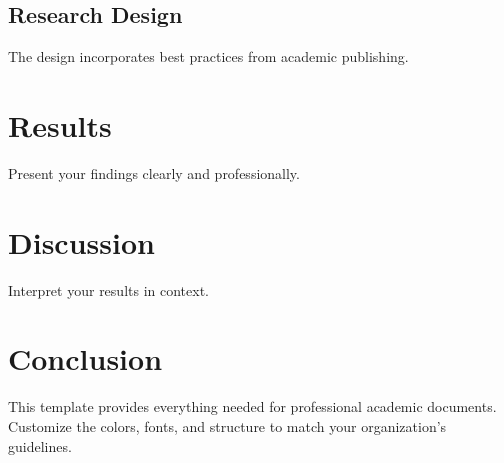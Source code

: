 \documentclass[11pt]{article}
\begin{document}
\subsection{Research Design}

The design incorporates best practices from academic publishing.

\section{Results}

Present your findings clearly and professionally.

\section{Discussion}

Interpret your results in context.

\section{Conclusion}

This template provides everything needed for professional academic documents. Customize the colors, fonts, and structure to match your organization's guidelines.

\nocite{*}
\printbibliography
\end{document}
